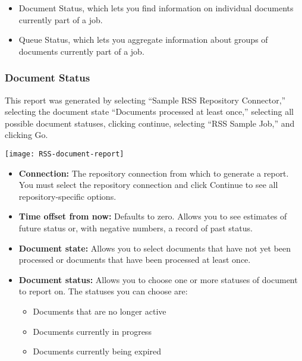 \begin{changemargin}{1.5in}{0in}
\begin{itemize}
\item Document Status, which lets you find information on individual
documents currently part of a job.

\item Queue Status, which lets you aggregate information about groups
of documents currently part of a job.

\end{itemize}

\subsubsection{Document Status}

This report was generated by selecting ``Sample RSS Repository
Connector,'' selecting the document state ``Documents processed at
least once,'' selecting all possible document statuses, clicking
continue, selecting ``RSS Sample Job,'' and clicking Go.

\texttt{[image: RSS-document-report]}

\begin{itemize}

\item \textbf{Connection:} The repository connection from which to 
generate a report. You must select the repository connection and click
Continue to see all repository-specific options. %

\item \textbf{Time offset from now:} Defaults to zero. Allows you to
see estimates of future status or, with negative numbers, a record of
past status.

\item \textbf{Document state:} Allows you to select documents that
have not yet been processed or documents that have been processed
at least once.

\item \textbf{Document status:} Allows you to choose one or more 
statuses of document to report on. The statuses you can choose are:

\begin{itemize}

\item Documents that are no longer active

\item Documents currently in progress

\item Documents currently being expired


\end{itemize}
\end{itemize}
\end{changemargin}
